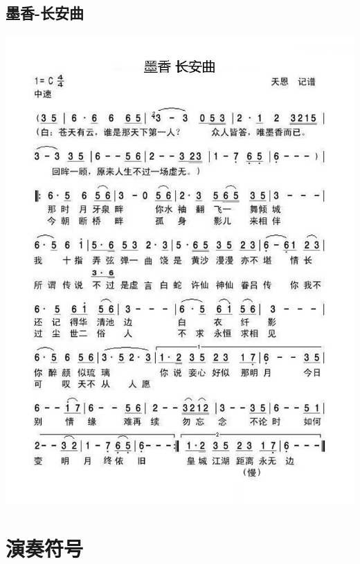 \documentclass[cn,pad,chinese,chinesefont=nofont]{elegantbook}
\begin{document}
\section{墨香-长安曲}
    \includegraphics[width=\textwidth]{dongxiao/20200323墨香-长安曲.jpg} 

\chapter{演奏符号}
\end{document}
